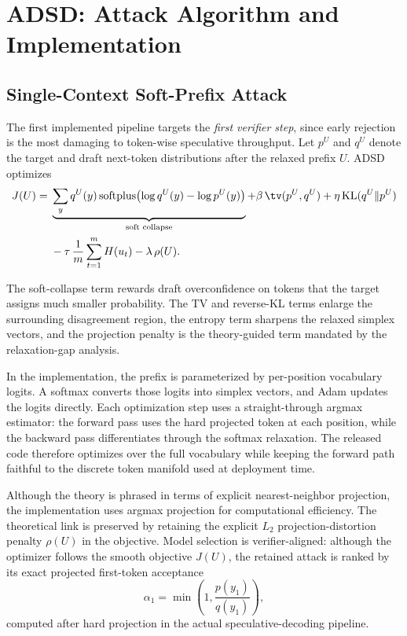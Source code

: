\section{ADSD: Attack Algorithm and Implementation}
\label{sec:attack}

\subsection{Single-Context Soft-Prefix Attack}

The first implemented pipeline targets the \emph{first verifier step}, since
early rejection is the most damaging to token-wise speculative throughput. Let
$p^U$ and $q^U$ denote the target and draft next-token distributions after the
relaxed prefix $U$. ADSD optimizes
\begin{align*}
J(U) ={}&
\underbrace{\sum_{y} q^U(y)\,\mathrm{softplus}\!\left(\log q^U(y)-\log p^U(y)\right)}_{\text{soft collapse}}
+ \beta \,\tv(p^U, q^U)
+ \eta \,\mathrm{KL}(q^U \Vert p^U) \\
&- \tau \,\frac{1}{m}\sum_{t=1}^{m} H(u_t)
- \lambda \,\rho(U).
\end{align*}

The soft-collapse term rewards draft overconfidence on tokens that the target
assigns much smaller probability. The TV and reverse-KL terms enlarge the
surrounding disagreement region, the entropy term sharpens the relaxed simplex
vectors, and the projection penalty is the theory-guided term mandated by the
relaxation-gap analysis.

In the implementation, the prefix is parameterized by per-position vocabulary
logits. A softmax converts those logits into simplex vectors, and Adam updates
the logits directly. Each optimization step uses a straight-through argmax
estimator: the forward pass uses the hard projected token at each position,
while the backward pass differentiates through the softmax relaxation. The
released code therefore optimizes over the full vocabulary while keeping the
forward path faithful to the discrete token manifold used at deployment time.

Although the theory is phrased in terms of explicit nearest-neighbor
projection, the implementation uses argmax projection for computational
efficiency. The theoretical link is preserved by retaining the explicit
$L_2$ projection-distortion penalty $\rho(U)$ in the objective. Model selection
is verifier-aligned: although the optimizer follows the smooth objective
$J(U)$, the retained attack is ranked by its exact projected first-token
acceptance
\[
\alpha_1 = \min\!\left(1, \frac{p(y_1)}{q(y_1)}\right),
\]
computed after hard projection in the actual speculative-decoding pipeline.

